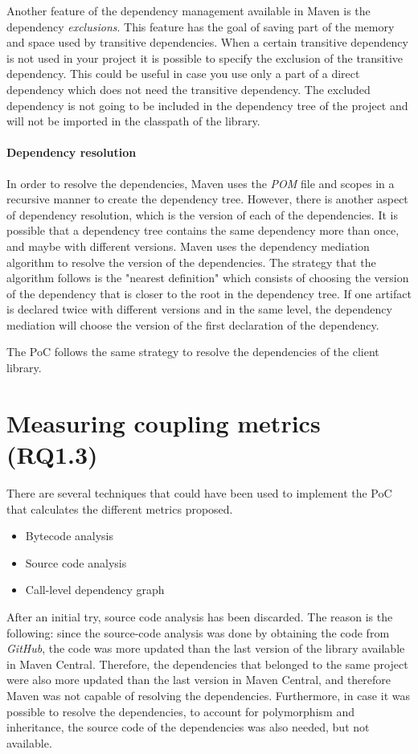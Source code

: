 Another feature of the dependency management available in Maven is the dependency \textit{exclusions}. This feature has the goal of saving part of the memory and space used by transitive dependencies. When a certain transitive dependency is not used in your project it is possible to specify the exclusion of the transitive dependency. This could be useful in case you use only a part of a direct dependency which does not need the transitive dependency. The excluded dependency is not going to be included in the dependency tree of the project and will not be imported in the classpath of the library.

\paragraph{Dependency resolution}
In order to resolve the dependencies, Maven uses the \textit{POM} file and scopes in a recursive manner to create the dependency tree. However, there is another aspect of dependency resolution, which is the version of each of the dependencies. It is possible that a dependency tree contains the same dependency more than once, and maybe with different versions. Maven uses the dependency mediation algorithm to resolve the version of the dependencies. The strategy that the algorithm follows is the "nearest definition" which consists of choosing the version of the dependency that is closer to the root in the dependency tree. If one artifact is declared twice with different versions and in the same level, the dependency mediation will choose the version of the first declaration of the dependency.

The PoC follows the same strategy to resolve the dependencies of the client library.

\section{Measuring coupling metrics (RQ1.3)}
There are several techniques that could have been used to implement the PoC that calculates the different metrics proposed.

\begin{itemize}
  \item Bytecode analysis
  \item Source code analysis
  \item Call-level dependency graph
\end{itemize}

After an initial try, source code analysis has been discarded. The reason is the following: since the source-code analysis was done by obtaining the code from \textit{GitHub}, the code was more updated than the last version of the library available in Maven Central. Therefore, the dependencies that belonged to the same project were also more updated than the last version in Maven Central, and therefore Maven was not capable of resolving the dependencies. Furthermore, in case it was possible to resolve the dependencies, to account for polymorphism and inheritance, the source code of the dependencies was also needed, but not available.


